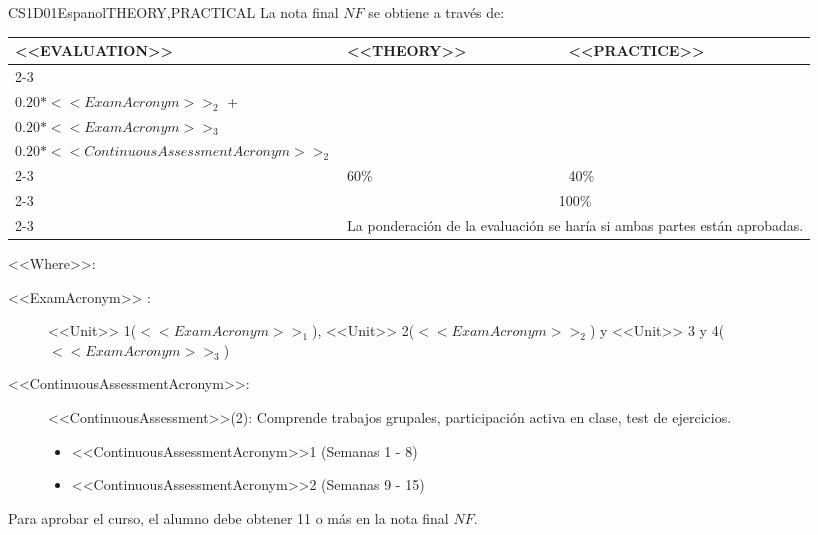   \begin{evaluation}{CS1D01}{Espanol}{THEORY,PRACTICAL}
  La nota final $NF$ se obtiene a través de:

  \begin{tabularx}{0.9\textwidth}{|X|p{}|p{}|} \hline
  \multirow{4}{*}{\uppercase{<<Evaluation>>}} & \uppercase{<<Theory>>} & \uppercase{<<Practice>>} \\ \cline{2-3}
  & %
      \begin{minipage}{0.95\textwidth}
      \begin{tabular}{l}
          $0.20*<<ExamAcronym>>_{1}$  + \\
          $0.20*<<ExamAcronym>>_{2}$  + \\
          $0.20*<<ExamAcronym>>_{3}$  
          \end{tabular} 
      \end{minipage} 
  & %
      \begin{minipage}{0.95\textwidth}
      \begin{tabular}{l}
          $0.20*<<ContinuousAssessmentAcronym>>_{1}$ + \\
          $0.20*<<ContinuousAssessmentAcronym>>_{2}$ 
      \end{tabular} 
      \end{minipage}                 \\ \cline{2-3}

  & %
  60\% 
  & %
  40\% \\ \cline{2-3}
  & \multicolumn{2}{|c|}{100\%}  \\ \cline{2-3}
  & \multicolumn{2}{|c|}{La ponderación de la evaluación se haría si ambas partes están aprobadas.}  \\ \hline
  \end{tabularx}
      
  \vspace{2mm}
  \noindent <<Where>>:
  \begin{description}
    \item[<<ExamAcronym>> :] <<Unit>> 1($<<ExamAcronym>>_{1}$), <<Unit>> 2($<<ExamAcronym>>_{2}$) y <<Unit>> 3 y 4($<<ExamAcronym>>_{3}$) 
      \item[<<ContinuousAssessmentAcronym>>:]<<ContinuousAssessment>>(2): Comprende trabajos grupales, participación activa en clase, test de ejercicios.
      \begin{itemize}
            \item <<ContinuousAssessmentAcronym>>1 (Semanas 1 - 8) 
            \item <<ContinuousAssessmentAcronym>>2 (Semanas 9 - 15)
      \end{itemize}
  \end{description}
 
  \noindent Para aprobar el curso, el alumno debe obtener 11 o más en la nota final $NF$.
  \end{evaluation}
 
